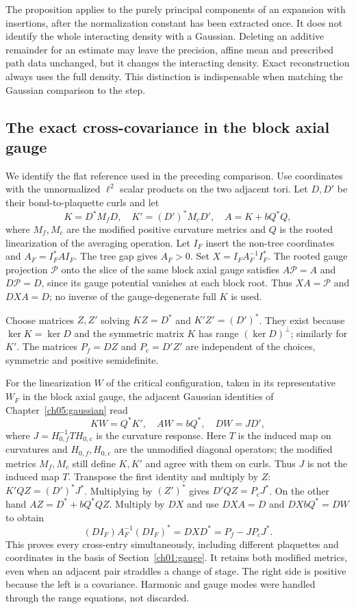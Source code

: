 The proposition applies to the purely principal components of an
expansion with insertions, after the normalization constant has been extracted once.
It does not identify the whole interacting density with a Gaussian.
Deleting an additive remainder for an estimate may leave the precision,
affine mean and prescribed path data unchanged, but it changes the
interacting density. Exact reconstruction always uses the full
density. This distinction is indispensable when matching the Gaussian
comparison to the step.

\subsection{The exact cross-covariance in the block axial gauge}
\label{ch11:tree-covariance}

We identify the flat reference used in the preceding comparison.
Use coordinates with the unnormalized $\ell^2$ scalar products on the two adjacent tori.
Let $D,D'$ be their bond-to-plaquette curls and let
\[
 K=D^*M_fD,\quad K'=(D')^*M_cD',\quad
 A=K+bQ^*Q ,
\]
where $M_f,M_c$ are the modified positive curvature metrics and $Q$
is the rooted linearization of the averaging operation. Let $I_F$ insert the non-tree
coordinates and $A_F=I_F^*AI_F$. The tree gap gives $A_F>0$.
Set $X=I_FA_F^{-1}I_F^*$.
The rooted gauge projection $\mathcal P$ onto the slice of the same block axial gauge
satisfies $A\mathcal P=A$ and $D\mathcal P=D$, since its gauge
potential vanishes at each block root. Thus $XA=\mathcal P$
and $DXA=D$; no inverse of the gauge-degenerate full $K$ is used.

Choose matrices $Z,Z'$ solving $KZ=D^*$ and $K'Z'=(D')^*$.
They exist because $\ker K=\ker D$ and the symmetric matrix $K$
has range $(\ker D)^\perp$; similarly for $K'$.
The matrices $P_f=DZ$ and $P_c=D'Z'$ are independent of the choices,
symmetric and positive semidefinite.

For the linearization $W$ of the critical configuration, taken in its representative $W_F$ in the block axial gauge, the adjacent
Gaussian identities of Chapter~\ref{ch05:gaussian} read
\[
 KW=Q^*K',\quad AW=bQ^*,\quad DW=JD',
\]
where $J=H_{0,f}^{-1}T H_{0,c}$ is the curvature response.
Here $T$ is the induced map on curvatures and $H_{0,f},H_{0,c}$
are the unmodified diagonal operators; the modified metrics
$M_f,M_c$ still define $K,K'$ and agree with them on curls.
Thus $J$ is not the induced map $T$.
Transpose the first identity and multiply by $Z$:
$K'QZ=(D')^*J^*$. Multiplying by $(Z')^*$ gives
$D'QZ=P_cJ^*$. On the other hand $AZ=D^*+bQ^*QZ$.
Multiply by $DX$ and use $DXA=D$ and $DXbQ^*=DW$ to obtain
\begin{equation}
 (DI_F)A_F^{-1}(DI_F)^*
       =DXD^*=P_f-JP_cJ^*.
 \label{ch11:conditional-curvature}
\end{equation}
This proves every cross-entry simultaneously, including different
plaquettes and coordinates in the basis of Section~\ref{ch01:gauge}. It retains both modified metrics,
even when an adjacent pair straddles a change of stage.
The right side is positive because the left is a covariance.
Harmonic and gauge modes were handled through the range equations,
not discarded.

